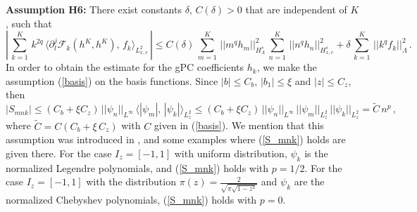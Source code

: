 \documentclass[final,onefignum,onetabnum]{siamart171218}
\newcounter{example}
\begin{document}
{\bf Assumption H6:}
There exist constants $\delta, \, C(\delta)>0$ that are independent of $K$, such that
\begin{equation}\label{H6_1} \left|\,\sum_{k=1}^K\, k^{2q}\, \langle\partial_l^j \mathcal F_{k}(h^K, h^K), \, f_{k}\rangle_{L^2_{x,v}}\, \right|
\leq C(\delta)\, \sum_{m=1}^K\, ||m^q h_m||_{H_{\Lambda}^s}^2 \, \sum_{n=1}^K\, ||n^q h_n||_{H_{x,v}^s}^2 + \delta\,\sum_{k=1}^K\, ||k^q f_k||_{\Lambda}^2\,. \end{equation}
In order to obtain the estimate for the gPC coefficients $h_k$, we make the assumption (\ref{basis}) on the basis functions. Since $|b|\leq C_b$,
$|b_1|\leq \xi$ and $|z|\leq C_z$, then
\begin{equation}\label{S_mnk} |S_{mnk}|\leq (C_b + \xi C_z)\, ||\psi_n||_{L^{\infty}}\, \langle |\psi_m|, \, |\psi_k|\rangle_{L^2_z} \leq (C_b + \xi C_z)\, ||\psi_n||_{L^{\infty}}\, ||\psi_m||_{L^2_z}\, ||\psi_k||_{L^2_z}=\widetilde C\, n^p\,, \end{equation}
where $\widetilde C= C (C_b + \xi\, C_z)$ with $C$ given in (\ref{basis}).
We mention that this assumption was introduced in \cite{Rui}, and some examples where (\ref{S_mnk}) holds are given there.
For the case $I_z=[-1,1]$ with uniform distribution, $\psi_k$ is the normalized Legendre polynomials,
and (\ref{S_mnk}) holds with $p=1/2$. For the case $I_z=[-1,1]$ with the distribution $\pi(z)=\frac{2}{\sqrt{\pi \sqrt{1-z^2}}}$ and
$\psi_k$ are the normalized Chebyshev polynomials, (\ref{S_mnk}) holds with $p=0$.  \\[1pt]
\end{document}
